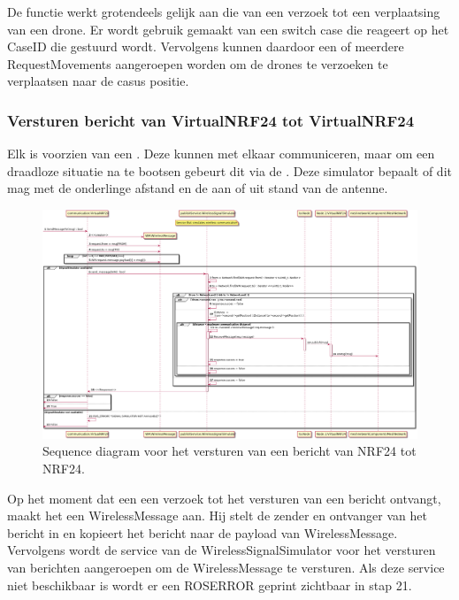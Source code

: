 \documentclass[a4paper, 11pt, oneside]{report}
\begin{document}
De functie werkt grotendeels gelijk aan die van een verzoek tot een verplaatsing van een drone. 
Er wordt gebruik gemaakt van een switch case die reageert op het CaseID die gestuurd wordt.
Vervolgens kunnen daardoor een of meerdere RequestMovements aangeroepen worden om de drones te verzoeken te verplaatsen naar de casus positie. 

\subsubsection{Versturen bericht van VirtualNRF24 tot VirtualNRF24}
\label{DetailedDesign:ros:sequence:sendmessage}

Elk  is voorzien van een .
Deze kunnen met elkaar communiceren, maar om een draadloze situatie na te bootsen gebeurt dit via de .
Deze simulator bepaalt of dit mag met de onderlinge afstand en de aan of uit stand van de antenne.

\begin{figure}[H]
	\begin{center}\includegraphics[width=\linewidth]{UML/out/ros/sequence/SendMessage/SendMessage.png}\end{center}
	\caption{Sequence diagram voor het versturen van een bericht van NRF24 tot NRF24.}
	\label{fig:ros:sequence:sequence:sendmessage}
\end{figure}

Op het moment dat een  een verzoek tot het versturen van een bericht ontvangt, maakt het een WirelessMessage aan.
Hij stelt de zender en ontvanger van het bericht in en kopieert het bericht naar de payload van WirelessMessage.
Vervolgens wordt de service van de WirelessSignalSimulator voor het versturen van berichten aangeroepen om de WirelessMessage te versturen.
Als deze service niet beschikbaar is wordt er een ROS\textunderscore ERROR geprint zichtbaar in stap 21.
\end{document}
